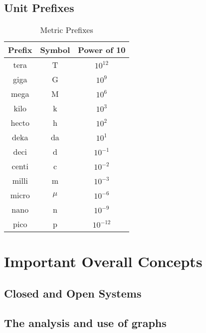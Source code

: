\documentclass{report}
\begin{document}
\section{Unit Prefixes}
\begin{table}[h]
  \caption{Metric Prefixes}
  \begin{center}
    \begin{tabular}{|c|c|c|}
      \hline
      \textbf{Prefix} & \textbf{Symbol} & \textbf{Power of 10} \\
      \hline
      \hline
      tera & T & $ 10^{12} $ \\
      \hline
      giga & G & $ 10^9 $ \\
      \hline
      mega & M & $ 10^6 $ \\
      \hline
      kilo & k & $ 10^3 $ \\
      \hline
      hecto & h & $ 10^2 $ \\
      \hline
      deka & da & $ 10^1 $ \\
      \hline
      \hline
      deci & d & $ 10^{-1} $ \\
      \hline
      centi & c & $ 10^{-2} $ \\
      \hline
      milli & m & $ 10^{-3} $ \\
      \hline
      micro & $\mu$ & $ 10^{-6} $ \\
      \hline
      nano & n & $ 10^{-9} $ \\
      \hline
      pico & p & $ 10^{-12} $ \\
      \hline
    \end{tabular}
  \end{center}
\end{table}

\chapter{Important Overall Concepts}

\section{Closed and Open Systems}

\section{The analysis and use of graphs}
\end{document}
